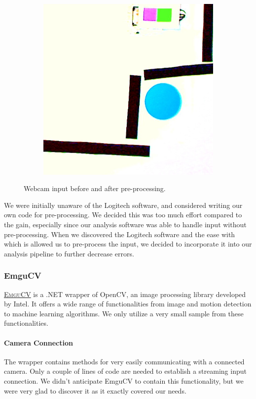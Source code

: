 \documentclass[10pt, abstracton, twocolumn]{scrartcl}
\newcommand{\link}[2]{\textsc{\href{#1}{#2}}}
\begin{document}
\begin{figure}
\begin{subfigure}[t]{0.45\columnwidth}
        \includegraphics[width=\columnwidth]{pictures/preprocessing2.png}
        \end{subfigure}
        \caption{\small Webcam input before and after pre-processing.}
        \label{fig:preprocessing}
\end{figure}

We were initially unaware of the Logitech software, and considered writing our own code for pre-processing. We decided this was too much effort compared to the gain, especially since our analysis software was able to handle input without pre-processing. When we discovered the Logitech software and the ease with which is allowed us to pre-process the input, we decided to incorporate it into our analysis pipeline to further decrease errors.

\subsubsection{EmguCV}
\link{http://www.emgu.com/wiki/index.php/Main_Page}{EmguCV} is a .NET wrapper of OpenCV, an image processing library developed by Intel. It offers a wide range of functionalities from image and motion detection to machine learning algorithms. We only utilize a very small sample from these functionalities.

\paragraph{Camera Connection}
The wrapper contains methods for very easily communicating with a connected camera. Only a couple of lines of code are needed to establish a streaming input connection. We didn't anticipate EmguCV to contain this functionality, but we were very glad to discover it as it exactly covered our needs.
\end{document}
